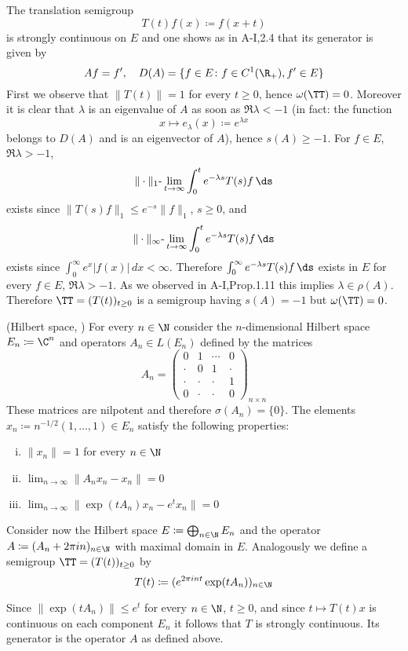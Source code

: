 The translation semigroup
\[
    T(t)f(x) \coloneqq f(x+t)
\]
is strongly continuous on $E$ and one shows as in A-I,2.4 that its generator is given by
\[
    Af = f', \quad D(A) = \{ f \in E \colon f \in C^{1}(\R_{+}), f' \in E \}
\]
First we observe that $\|T(t)\| = 1$ for every $t \geq 0$, hence $\omega(\TT) = 0$.
Moreover it is clear that $\lambda$ is an eigenvalue of $A$ as soon as $\Re\lambda < -1$ (in fact: the function
\[
    x \mapsto e_{\lambda}(x) \coloneqq e^{\lambda x}
\]
belongs to $D(A)$ and is an eigenvector of $A$), hence $s(A) \geq -1$.
For $f \in E$, $\Re\lambda > -1$,
\[
    \|\cdot\|_{1}\text{-}\lim_{t \to \infty} \int_{0}^{t} e^{-\lambda s}T(s)f \, \ds
\]
exists since $\|T(s)f\|_{1} \leq e^{-s}\|f\|_{1}$, $s \geq 0$, and
\[
    \|\cdot\|_{\infty}\text{-}\lim_{t \to \infty} \int_{0}^{t} e^{-\lambda s}T(s)f \, \ds
\]
exists since $\int_{0}^{\infty} e^{x}|f(x)| \, dx < \infty$.
Therefore $\int_{0}^{\infty} e^{-\lambda s}T(s)f \, \ds$ exists in $E$ for every $f \in E$, $\Re\lambda > -1$.
As we observed in A-I,Prop.1.11 this implies $\lambda \in \rho(A)$.
Therefore $\TT = (T(t))_{t\geq 0}$ is a semigroup having $s(A) = -1$ but $\omega(\TT) = 0$.
\begin{example}\label{ex:a3-1.4}
(Hilbert space, \citet{zabczyk:1975})
For every $n \in \N$ consider the $n$-dimensional Hilbert space $E_{n} \coloneqq \C^{n}$ and operators $A_{n} \in L(E_{n})$ defined by the matrices
\[
    A_{n} =
    \begin{pmatrix}
    0 & 1 & \cdots & 0 \\
    \cdot & 0 & 1 & \cdot \\
    \cdot & \cdot & \cdot & 1 \\
    0 & \cdot & \cdot & 0
    \end{pmatrix}_{n \times n}
\]
These matrices are nilpotent and therefore $\sigma(A_{n}) = \{0\}$.
The elements 
\newline 
$x_{n} \coloneqq n^{-1/2}(1, \ldots, 1) \in E_{n}$ satisfy the following properties:
\begin{enumerate}[(i)]
\item
$\|x_{n}\| = 1$ for every $n \in \N$

\item
$\lim_{n \to \infty} \|A_{n}x_{n} - x_{n}\| = 0$

\item
$\lim_{n \to \infty} \|\exp(tA_{n})x_{n} - e^{t}x_{n}\| = 0$

\end{enumerate}
Consider now the Hilbert space $E \coloneqq \bigoplus_{n \in \N} E_{n}$ and the operator $A \coloneqq (A_{n} + 2\pi in)_{n \in \N}$ with maximal domain in $E$.
Analogously we define a semigroup $\TT = (T(t))_{t \geq 0}$ by
\[
    T(t) \coloneqq (e^{2\pi int}\exp(tA_{n}))_{n \in \N}
\]
\end{example}
Since $\|\exp(tA_{n})\| \leq e^{t}$ for every $n \in \N$, $t \geq 0$, and since $t \mapsto T(t)x$ is continuous on each component $E_{n}$ it follows that $T$ is strongly continuous.
Its generator is the operator $A$ as defined above.

